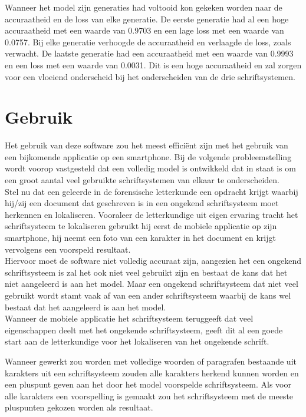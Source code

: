 Wanneer het model zijn generaties had voltooid kon gekeken worden naar de accuraatheid en de loss van elke generatie.
De eerste generatie had al een hoge accuraatheid met een waarde van 0.9703 en een lage loss met een waarde van 0.0757.
Bij elke generatie verhoogde de accuraatheid en verlaagde de loss, zoals verwacht.
De laatste generatie had een accuraatheid met een waarde van 0.9993 en een loss met een waarde van 0.0031.
Dit is een hoge accuraatheid en zal zorgen voor een vloeiend onderscheid bij het onderscheiden van de drie schriftsystemen.


\section{Gebruik}

Het gebruik van deze software zou het meest efficiënt zijn met het gebruik van een bijkomende applicatie op een smartphone.
Bij de volgende probleemstelling wordt voorop vastgesteld dat een volledig model is ontwikkeld dat in staat is om een groot aantal veel gebruikte schriftsystemen van elkaar te onderscheiden. \\
Stel nu dat een geleerde in de forensische letterkunde een opdracht krijgt waarbij hij/zij een document dat geschreven is in een ongekend schriftsysteem moet herkennen en lokaliseren. Vooraleer de letterkundige uit eigen ervaring tracht het schriftsysteem te lokaliseren gebruikt hij eerst de mobiele applicatie op zijn smartphone, hij neemt een foto van een karakter in het document en krijgt vervolgens een voorspeld resultaat. \\
Hiervoor moet de software niet volledig accuraat zijn, aangezien het een ongekend schriftsysteem is zal het ook niet veel gebruikt zijn en bestaat de kans dat het niet aangeleerd is aan het model.
Maar een ongekend schriftsysteem dat niet veel gebruikt wordt stamt vaak af van een ander schriftsysteem waarbij de kans wel bestaat dat het aangeleerd is aan het model. \\
Wanneer de mobiele applicatie het schriftsysteem teruggeeft dat veel eigenschappen deelt met het ongekende schriftsysteem, geeft dit al een goede start aan de letterkundige voor het lokaliseren van het ongekende schrift.

Wanneer gewerkt zou worden met volledige woorden of paragrafen bestaande uit karakters uit een schriftsysteem zouden alle karakters herkend kunnen worden en een pluspunt geven aan het door het model voorspelde schriftsysteem.
Als voor alle karakters een voorspelling is gemaakt zou het schriftsysteem met de meeste pluspunten gekozen worden als resultaat.

